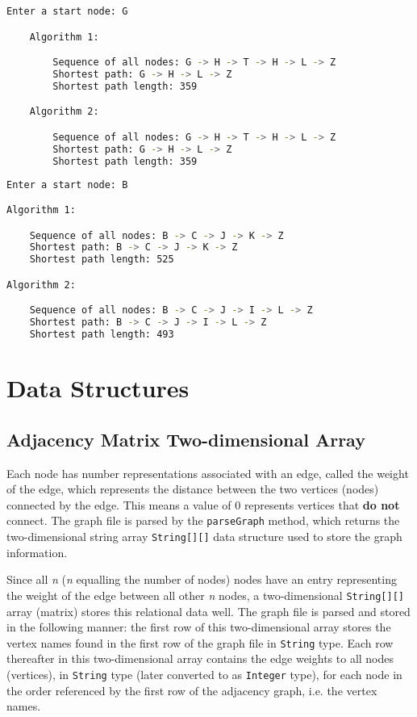 \begin{lstlisting}[language=Bash]
    Enter a start node: G

    Algorithm 1:

        Sequence of all nodes: G -> H -> T -> H -> L -> Z
        Shortest path: G -> H -> L -> Z
        Shortest path length: 359

    Algorithm 2:

        Sequence of all nodes: G -> H -> T -> H -> L -> Z
        Shortest path: G -> H -> L -> Z
        Shortest path length: 359
\end{lstlisting}

\begin{lstlisting}[language=Bash]
Enter a start node: B

Algorithm 1:

	Sequence of all nodes: B -> C -> J -> K -> Z
	Shortest path: B -> C -> J -> K -> Z
	Shortest path length: 525

Algorithm 2:

	Sequence of all nodes: B -> C -> J -> I -> L -> Z
	Shortest path: B -> C -> J -> I -> L -> Z
	Shortest path length: 493
\end{lstlisting}

\newpage


\section*{Data Structures}

\hypertarget{array}{\subsection*{Adjacency Matrix Two-dimensional Array}}
Each node has number representations associated with an edge, called the weight of the edge, which represents the distance between the two vertices (nodes) connected by the edge. This means a value of 0 represents vertices that \textbf{do not} connect. The graph file is parsed by the \texttt{parseGraph} method, which returns the two-dimensional string array \texttt{String[][]} data structure used to store the graph information.

Since all \emph{n} (\emph{n} equalling the number of nodes) nodes have an entry representing the weight of the edge between all other \emph{n} nodes, a two-dimensional \texttt{String[][]} array (matrix) stores this relational data well. The graph file is parsed and stored in the following manner: the first row of this two-dimensional array stores the vertex names found in the first row of the graph file in \texttt{String} type. Each row thereafter in this two-dimensional array contains the edge weights to all nodes (vertices), in \texttt{String} type (later converted to as \texttt{Integer} type), for each node in the order referenced by the first row of the adjacency graph, i.e. the vertex names.

